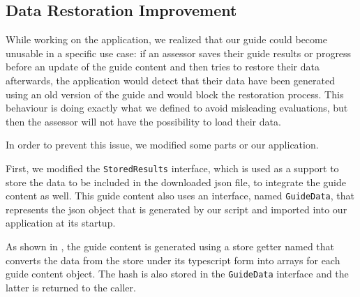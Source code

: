 \subsection{Data Restoration Improvement}
\label{subsec:app_implementation_improvement}

While working on the application, we realized that our guide could become unusable in a specific use case: if an assessor saves their guide results or progress before an update of the guide content and then tries to restore their data afterwards, the application would detect that their data have been generated using an old version of the guide and would block the restoration process. This behaviour is doing exactly what we defined to avoid misleading evaluations, but then the assessor will not have the possibility to load their data.

In order to prevent this issue, we modified some parts or our application.

First, we modified the \texttt{StoredResults} interface, which is used as a support to store the data to be included in the downloaded \gls{json} file, to integrate the guide content as well. This guide content also uses an interface, named \texttt{GuideData}, that represents the \gls{json} object that is generated by our  script and imported into our application at its startup.

As shown in , the guide content is generated using a store getter named  that converts the data from the store under its \gls{typescript}  form into arrays for each guide content object. The hash is also stored in the \texttt{GuideData} interface and the latter is returned to the caller.

